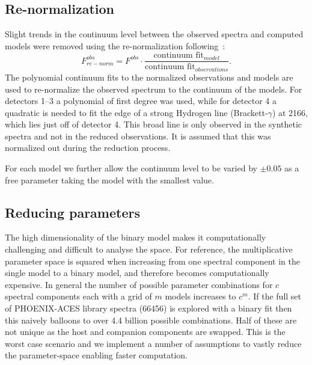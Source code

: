 \subsection{Re-normalization}
\label{subsec:renorm}
Slight trends in the continuum level between the observed spectra and computed models were removed using the re-normalization following~\citet{passegger_fundamental_2016}:
\begin{equation}
F^{obs}_{re-norm} = F^{obs} \cdot \frac{\textrm{continuum fit}_{model}}{\textrm{continuum fit}_{observations}}.
\end{equation}
The polynomial continuum fits to the normalized observations and models are used to re-normalize the observed spectrum to the continuum of the models.
For detectors 1--3 a polynomial of first degree was used, while for detector 4 a quadratic is needed to fit the edge of a strong Hydrogen line (Brackett-\(\gamma\)) at 2166\nm{}, which lies just off of detector 4.
This broad line is only observed in the synthetic spectra and not in the reduced observations.
It is assumed that this was normalized out during the reduction process.

For each model we further allow the continuum level to be varied by \(\pm 0.05\) as a free parameter taking the model with the smallest \textchisquared{} value.


\subsection{Reducing parameters}
\label{subsec:reduce-params}
The high dimensionality of the binary model makes it computationally challenging and difficult to analyse the \textchisquared{} space.
For reference, the multiplicative parameter space is squared when increasing from one spectral component in the single model to a binary model, and therefore becomes computationally expensive.
In general the number of possible parameter combinations for \(c\) spectral components each with a grid of \(m\) models increases to \(c^m\).
If the full set of {PHOENIX-ACES} library spectra (66456) is explored with a binary fit then this naively balloons to over 4.4 billion possible combinations.
Half of these are not unique as the host and companion components are swapped.
This is the worst case scenario and we implement a number of assumptions to vastly reduce the parameter-space enabling faster computation.

